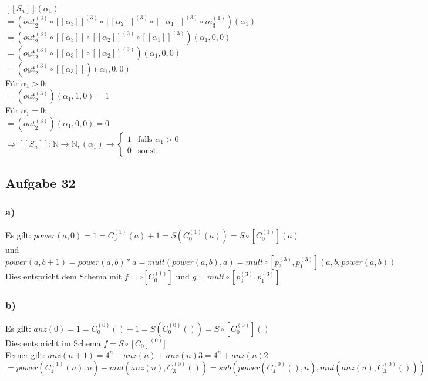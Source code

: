 \documentclass[11pt]{amsart}
\begin{document}
\begin{tabbing}
$[[S_n]](\alpha_1)$ \= $= (\underline{out}^{(3)}_2 \circ [[\alpha_3]]^{(3)}  
\circ [[\alpha_2]]^{(3)} \circ [[\alpha_1]]^{(3)} \circ \underline{in}^{(1)}_3)(\alpha_1)$ \\
\> $= (\underline{out}^{(3)}_2 \circ [[\alpha_3]] \circ [[\alpha_2]]^{(3)} \circ [[\alpha_1]]^{(3)})(\alpha_1,0,0)$ \\
\> $= (\underline{out}^{(3)}_2 \circ [[\alpha_3]] \circ [[\alpha_2]]^{(3)})(\alpha_1,0,0)$ \\
\> $= (\underline{out}^{(3)}_2 \circ [[\alpha_3]])(\alpha_1,0,0)$ \\
Für $\alpha_1 > 0$: \\
\> $= (\underline{out}^{(3)}_2)(\alpha_1,1,0) = 1$ \\
Für $\alpha_1 = 0$: \\
\> $= (\underline{out}^{(3)}_2)(\alpha_1,0,0) = 0$ \\
$\Rightarrow [[S_n]]: \mathbb{N} \rightarrow \mathbb{N}, (\alpha_1) \rightarrow \begin{cases} 1 &\mbox{falls } \alpha_1>0 \\ 0 &\mbox{sonst} \end{cases}$
\end{tabbing}

\subsection*{Aufgabe 32}

\subsubsection*{a)} 
Es gilt: $power(a,0) = 1 = C_0^{(1)}(a) + 1 = S(C_0^{(1)}(a)) = 
S \circ [C_0^{(1)}](a)$ \\
und $power(a,b+1) = power(a,b)*a = mult(power(a,b),a) =
mult \circ [p_3^{(3)},p_1^{(3)}](a,b,power(a,b))$ \\
Dies entspricht dem Schema mit $f = \circ [C_0^{(1)}]$ und $g = mult \circ [p_3^{(3)},p_1^{(3)}]$ \\

\subsubsection*{b)}
Es gilt: $anz(0) = 1 = C_0^{(0)}() + 1 = S(C_0^{(0)}()) = 
S \circ [C_0^{(0)}]()$ \\
Dies entspricht im Schema $f = S \circ [C_0]^{(0)}]$ \\
Ferner gilt: $anz(n+1) = 4^n - anz(n) + anz(n)  3 = 4^n + anz(n)  2$ \\
$= power(C_4^{(1)}(n),n) - mul(anz(n),C_3^{(0)}()) = sub(power(C_4^{(0)}(),n),mul(anz(n),C_3^{(0)}()))$ \\
\end{document}
